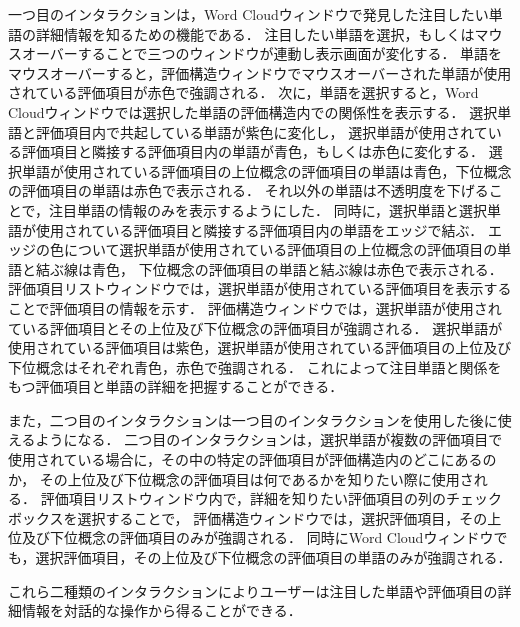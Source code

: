 \documentclass[syuuron]{kuee}
\begin{document}
			一つ目のインタラクションは，Word Cloudウィンドウで発見した注目したい単語の詳細情報を知るための機能である．
			注目したい単語を選択，もしくはマウスオーバーすることで三つのウィンドウが連動し表示画面が変化する．
			単語をマウスオーバーすると，評価構造ウィンドウでマウスオーバーされた単語が使用されている評価項目が赤色で強調される．
			次に，単語を選択すると，Word Cloudウィンドウでは選択した単語の評価構造内での関係性を表示する．
			選択単語と評価項目内で共起している単語が紫色に変化し，
			選択単語が使用されている評価項目と隣接する評価項目内の単語が青色，もしくは赤色に変化する．
			選択単語が使用されている評価項目の上位概念の評価項目の単語は青色，下位概念の評価項目の単語は赤色で表示される．
			それ以外の単語は不透明度を下げることで，注目単語の情報のみを表示するようにした．
			同時に，選択単語と選択単語が使用されている評価項目と隣接する評価項目内の単語をエッジで結ぶ．
			エッジの色について選択単語が使用されている評価項目の上位概念の評価項目の単語と結ぶ線は青色，
			下位概念の評価項目の単語と結ぶ線は赤色で表示される．
			評価項目リストウィンドウでは，選択単語が使用されている評価項目を表示することで評価項目の情報を示す．
			評価構造ウィンドウでは，選択単語が使用されている評価項目とその上位及び下位概念の評価項目が強調される．
			選択単語が使用されている評価項目は紫色，選択単語が使用されている評価項目の上位及び下位概念はそれぞれ青色，赤色で強調される．
			これによって注目単語と関係をもつ評価項目と単語の詳細を把握することができる．
			
			また，二つ目のインタラクションは一つ目のインタラクションを使用した後に使えるようになる．
			二つ目のインタラクションは，選択単語が複数の評価項目で使用されている場合に，その中の特定の評価項目が評価構造内のどこにあるのか，
			その上位及び下位概念の評価項目は何であるかを知りたい際に使用される．
			評価項目リストウィンドウ内で，詳細を知りたい評価項目の列のチェックボックスを選択することで，
			評価構造ウィンドウでは，選択評価項目，その上位及び下位概念の評価項目のみが強調される．
			同時にWord Cloudウィンドウでも，選択評価項目，その上位及び下位概念の評価項目の単語のみが強調される．
			
			これら二種類のインタラクションによりユーザーは注目した単語や評価項目の詳細情報を対話的な操作から得ることができる．
			
\end{document}
